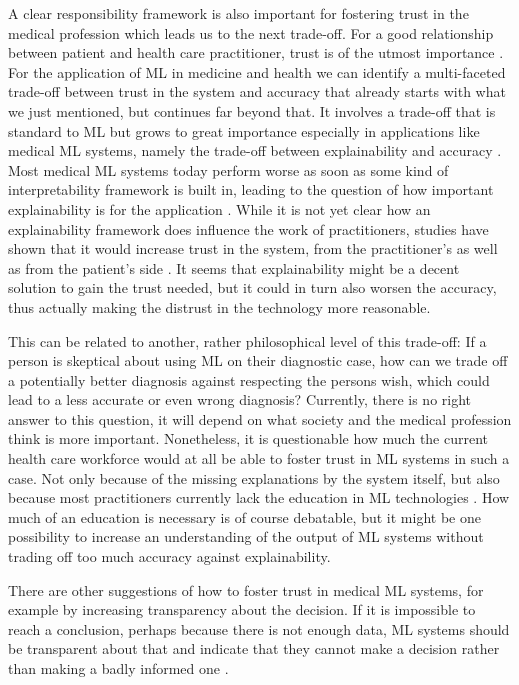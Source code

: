 A clear responsibility framework is also important for fostering trust in the medical profession which leads us to the next trade-off. For a good relationship between patient and health care practitioner, trust is of the utmost importance \cite{clark2002trust}. For the application of ML in medicine and health we can identify a multi-faceted trade-off between trust in the system and accuracy that already starts with what we just mentioned, but continues far beyond that. It involves a trade-off that is standard to ML but grows to great importance especially in applications like medical ML systems, namely the trade-off between explainability and accuracy \cite{topol2019high, kelly2019key}. Most medical ML systems today perform worse as soon as some kind of interpretability framework is built in, leading to the question of how important explainability is for the application \cite{luo2019balancing}. While it is not yet clear how an explainability framework does influence the work of practitioners, studies have shown that it would increase trust in the system, from the practitioner's as well as from the patient's side \cite{diprose2020physician, topol2019high}. It seems that explainability might be a decent solution to gain the trust needed, but it could in turn also worsen the accuracy, thus actually making the distrust in the technology more reasonable.

This can be related to another, rather philosophical level of this trade-off: If a person is skeptical about using ML on their diagnostic case, how can we trade off a potentially better diagnosis against respecting the persons wish, which could lead to a less accurate or even wrong diagnosis? Currently, there is no right answer to this question, it will depend on what society and the medical profession think is more important. Nonetheless, it is questionable how much the current health care workforce would at all be able to foster trust in ML systems in such a case. Not only because of the missing explanations by the system itself, but also because most practitioners currently lack the education in ML technologies \cite{he2019practical}. How much of an education is necessary is of course debatable, but it might be one possibility to increase an understanding of the output of ML systems without trading off too much accuracy against explainability.

There are other suggestions of how to foster trust in medical ML systems, for example by increasing transparency about the decision. If it is impossible to reach a conclusion, perhaps because there is not enough data, ML systems should be transparent about that and indicate that they cannot make a decision rather than making a badly informed one \cite{horgan2019artificial}. 

